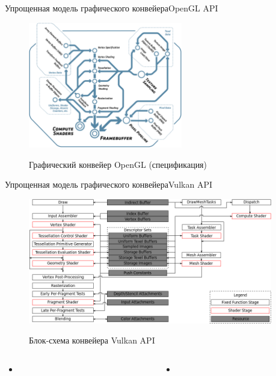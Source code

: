 \documentclass{beamer}
\begin{document}
\begin{frame}{Упрощенная модель графического конвейера}{OpenGL API}
	\begin{figure}
		\href{https://registry.khronos.org/OpenGL/specs/gl/glspec46.core.pdf}{
			\includegraphics[width=0.6\textwidth]{images/OpenGL_specification_graphics_pipeline.png}}
		\caption{Графический конвейер OpenGL (спецификация)}
	\end{figure}

	\note {

	}
\end{frame}

\begin{frame}{Упрощенная модель графического конвейера}{Vulkan API}
	\begin{figure}
		\href{https://docs.vulkan.org/spec/latest/chapters/pipelines.html}{
			\includegraphics[width=0.95\textwidth]{images/Vulkan_pipelinemesh.png}}
		\caption{Блок-схема конвейера Vulkan API}
	\end{figure}

	\note {


	}
\end{frame}

	\begin{columns}

		\begin{column}{0.5\textwidth}
			\begin{itemize}
				\item

			\end{itemize}
		\end{column}
		\begin{column}{0.5\textwidth}
			\begin{itemize}
				\item
			\end{itemize}
		\end{column}

	\end{columns}
\fi
\end{document}
